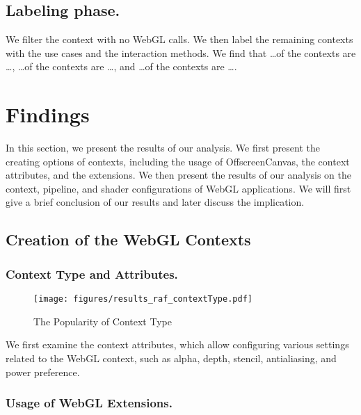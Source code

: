 \subsection{Labeling phase.}

We filter the context with no WebGL calls. We then label the remaining contexts with the use cases and the interaction methods. We find that \dots of the contexts are \dots, \dots of the contexts are \dots, and \dots of the contexts are \dots.













\section{Findings}

In this section, we present the results of our analysis. We first present the creating options of contexts, including the usage of OffscreenCanvas, the context attributes, and the extensions. We then present the results of our analysis on the context, pipeline, and shader configurations of WebGL applications. We will first give a brief conclusion of our results and later discuss the implication.

\subsection{Creation of the WebGL Contexts}

\subsubsection{Context Type and Attributes.}

\begin{figure}[tp]
\centering
\texttt{[image: figures/results\_raf\_contextType.pdf]}
\caption{The Popularity of Context Type}\label{fig_context_type}
\end{figure}

We first examine the context attributes, which allow configuring various settings related to the WebGL context, such as alpha, depth, stencil, antialiasing, and power preference.

\subsubsection{Usage of WebGL Extensions.}

